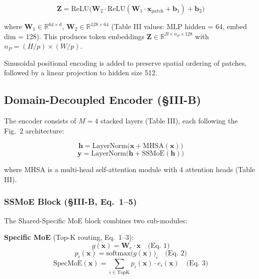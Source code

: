 \documentclass[conference]{IEEEtran}
\begin{document}
\begin{equation}
    \mathbf{Z} = \text{ReLU}\big(\mathbf{W}_2 \cdot \text{ReLU}(\mathbf{W}_1 \cdot \mathbf{x}_\text{patch} + \mathbf{b}_1) + \mathbf{b}_2\big)
\end{equation}

where $\mathbf{W}_1 \in \mathbb{R}^{64 \times d}$, $\mathbf{W}_2 \in \mathbb{R}^{128 \times 64}$ (Table III values: MLP hidden = 64, embed dim = 128). This produces token embeddings $\mathbf{Z} \in \mathbb{R}^{B \times n_P \times 128}$ with $n_P = (H/p) \times (W/p)$.

Sinusoidal positional encoding is added to preserve spatial ordering of patches, followed by a linear projection to hidden size 512.

\subsection{Domain-Decoupled Encoder (\S III-B)}

The encoder consists of $M = 4$ stacked layers (Table III), each following the Fig.~2 architecture:

\begin{equation}
    \mathbf{h} = \text{LayerNorm}\big(\mathbf{x} + \text{MHSA}(\mathbf{x})\big)
\end{equation}
\begin{equation}
    \mathbf{y} = \text{LayerNorm}\big(\mathbf{h} + \text{SSMoE}(\mathbf{h})\big)
\end{equation}

where MHSA is a multi-head self-attention module with 4 attention heads (Table III).

\subsubsection{SSMoE Block (\S III-B, Eq.~1--5)}

The Shared-Specific MoE block combines two sub-modules:

\textbf{Specific MoE} (Top-K routing, Eq.~1--3):
\begin{equation}
    g(\mathbf{x}) = \mathbf{W}_e \cdot \mathbf{x} \quad \text{(Eq. 1)}
\end{equation}
\begin{equation}
    p_i(\mathbf{x}) = \text{softmax}\big(g(\mathbf{x})\big)_i \quad \text{(Eq. 2)}
\end{equation}
\begin{equation}
    \text{SpecMoE}(\mathbf{x}) = \sum_{i \in \text{TopK}} p_i(\mathbf{x}) \cdot e_i(\mathbf{x}) \quad \text{(Eq. 3)}
\end{equation}
\end{document}
